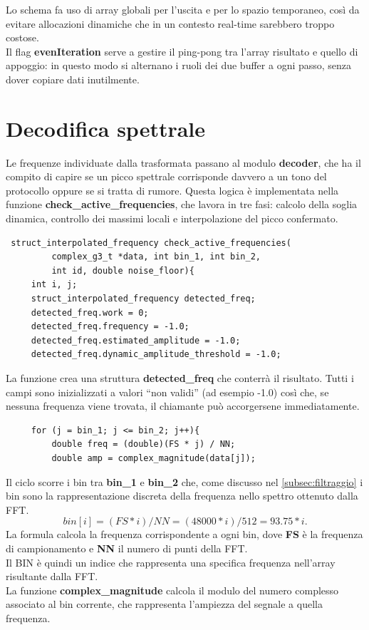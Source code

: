 Lo schema fa uso di array globali per l’uscita e per lo spazio temporaneo, così da evitare allocazioni
 dinamiche che in un contesto real-time sarebbero troppo costose.\\
  Il flag \textbf{evenIteration} serve 
 a gestire il ping-pong tra l’array risultato e quello di appoggio:
 in questo modo si alternano i ruoli dei due buffer a ogni passo, senza dover copiare dati inutilmente.


 \section{Decodifica spettrale}

 Le frequenze individuate dalla trasformata passano al modulo \textbf{decoder}, 
 che ha il compito di capire se un picco spettrale corrisponde davvero a un tono
  del protocollo oppure se si tratta di rumore. Questa logica è implementata nella funzione
   \textbf{check\_active\_frequencies}, che lavora in tre fasi: calcolo della soglia dinamica,
    controllo dei massimi locali e interpolazione del picco confermato.  
 
 \begin{verbatim}
 struct_interpolated_frequency check_active_frequencies(
         complex_g3_t *data, int bin_1, int bin_2,
         int id, double noise_floor){
     int i, j;
     struct_interpolated_frequency detected_freq;
     detected_freq.work = 0;
     detected_freq.frequency = -1.0;
     detected_freq.estimated_amplitude = -1.0;
     detected_freq.dynamic_amplitude_threshold = -1.0;
 \end{verbatim}
 
 La funzione crea una struttura \textbf{detected\_freq} che conterrà il risultato. 
 Tutti i campi sono inizializzati a valori “non validi” (ad esempio -1.0) così che, 
 se nessuna frequenza viene trovata, il chiamante può accorgersene immediatamente.  
 
 \begin{verbatim}
     for (j = bin_1; j <= bin_2; j++){
         double freq = (double)(FS * j) / NN;
         double amp = complex_magnitude(data[j]);
 \end{verbatim}
 
 Il ciclo scorre i bin tra \textbf{bin\_1} e \textbf{bin\_2} che, come discusso nel \autoref{subsec:filtraggio} i bin sono 
 la rappresentazione discreta della frequenza nello spettro ottenuto dalla FFT.
 \begin{equation}
    bin[i] = (FS * i) / NN = (48000 * i) / 512 = 93.75 * i.
 \end{equation}
  La formula calcola la frequenza corrispondente a ogni bin, dove \textbf{FS} è la frequenza di campionamento e \textbf{NN} il numero di punti della FFT.\\
  Il BIN è quindi un indice che rappresenta una specifica frequenza nell'array risultante dalla FFT.\\
   La funzione \textbf{complex\_magnitude} calcola il modulo del numero complesso associato al bin corrente, che rappresenta l’ampiezza del segnale a quella frequenza.\\

